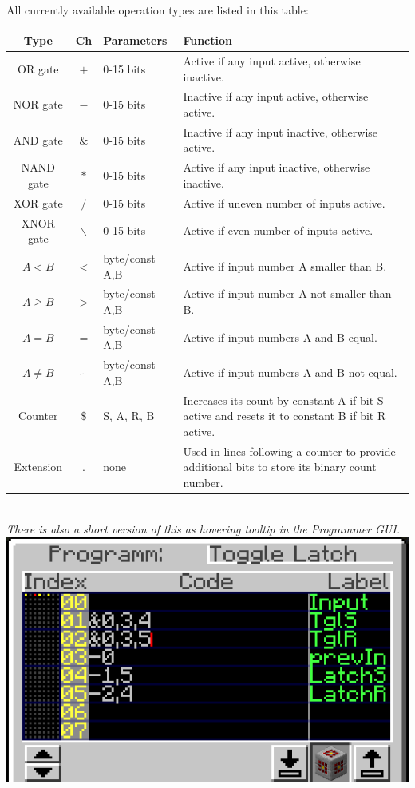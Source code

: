 \documentclass[11pt]{article} %
\begin{document}
All currently available operation types are listed in this table: \\
\begin{tabularx}{\textwidth}{|c|c|l|X|} \hline
\bf Type & \bf Ch & \bf Parameters & \bf Function \\\hline
OR gate & $+$ & 0-15 bits & Active if any input active, otherwise inactive. \\\hline
NOR gate & $-$ & 0-15 bits & Inactive if any input active, otherwise active. \\\hline
AND gate & $\&$ & 0-15 bits & Inactive if any input inactive, otherwise active. \\\hline
NAND gate & $*$ & 0-15 bits & Active if any input inactive, otherwise inactive. \\\hline
XOR gate & $/$ & 0-15 bits & Active if uneven number of inputs active. \\\hline
XNOR gate & $\backslash$ & 0-15 bits & Active if even number of inputs active. \\\hline
$A < B$ & $<$ & byte/const A,B & Active if input number A smaller than B. \\\hline
$A \geq B$ & $>$ & byte/const A,B & Active if input number A not smaller than B. \\\hline
$A = B$ & $=$ & byte/const A,B & Active if input numbers A and B equal. \\\hline
$A \neq B$ & $\widetilde{}$ & byte/const A,B & Active if input numbers A and B not equal. \\\hline
Counter & $\$$ & S, A, R, B & Increases its count by constant A if bit S active and resets it to constant B if bit R active. \\\hline
Extension & $.$ & none & Used in lines following a counter to provide additional bits to store its binary count number. \\\hline
\end{tabularx}\\
\it There is also a short version of this as hovering tooltip in the Programmer GUI. \rm\\
\includegraphics[width = \textwidth]{programmer_gui}\\
\end{document}
